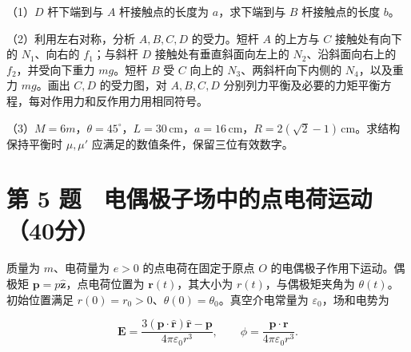 \documentclass[12pt,a4paper,fontset=fandol]{ctexart}
\begin{document}
（1）\(D\) 杆下端到与 \(A\) 杆接触点的长度为 \(a\)，求下端到与 \(B\)
杆接触点的长度 \(b\)。

（2）利用左右对称，分析 \(A,B,C,D\) 的受力。短杆 \(A\) 的上方与 \(C\)
接触处有向下的 \(N_1\)、向右的 \(f_1\)；与斜杆 \(D\)
接触处有垂直斜面向左上的 \(N_2\)、沿斜面向右上的 \(f_2\)，并受向下重力
\(mg\)。短杆 \(B\) 受 \(C\) 向上的 \(N_3\)、两斜杆向下内侧的
\(N_4\)，以及重力 \(mg\)。画出 \(C,D\) 的受力图，对 \(A,B,C,D\)
分别列力平衡及必要的力矩平衡方程，每对作用力和反作用力用相同符号。

（3）\(M=6m\)，\(\theta=45^\circ\)，\(L=30\,\mathrm{cm}\)，\(a=16\,\mathrm{cm}\)，\(R=2(\sqrt2-1)\,\mathrm{cm}\)。求结构保持平衡时
\(\mu,\mu'\) 应满足的数值条件，保留三位有效数字。

\clearpage

\section{第 5
题　电偶极子场中的点电荷运动（40分）}\label{ux7b2c-5-ux9898-ux7535ux5076ux6781ux5b50ux573aux4e2dux7684ux70b9ux7535ux8377ux8fd0ux52a840ux5206}

质量为 \(m\)、电荷量为 \(e>0\) 的点电荷在固定于原点 \(O\)
的电偶极子作用下运动。偶极矩
\(\boldsymbol p=p\hat{\boldsymbol z}\)，点电荷位置为
\(\boldsymbol r(t)\)，其大小为 \(r(t)\)，与偶极矩夹角为
\(\theta(t)\)。初始位置满足
\(r(0)=r_0>0\)、\(\theta(0)=\theta_0\)。真空介电常量为
\(\varepsilon_0\)，场和电势为

\[\boldsymbol E=\frac{3(\boldsymbol p\cdot\hat{\boldsymbol r})\hat{\boldsymbol r}-\boldsymbol p}
{4\pi\varepsilon_0r^3},\qquad
\phi=\frac{\boldsymbol p\cdot\boldsymbol r}{4\pi\varepsilon_0r^3}.\]

\begin{center}
\begin{minipage}{\linewidth}
\centering\begingroup{}
\ifdim\wd\diagrambox>.88\linewidth
\sbox{\diagrambox}{\resizebox{.88\linewidth}{!}{\usebox{\diagrambox}}}\fi
\ifdim\ht\diagrambox>.38\textheight
\resizebox{!}{.38\textheight}{\usebox{\diagrambox}}
\else\usebox{\diagrambox}\fi
\par{}\endgroup\end{minipage}\end{center}
\end{document}
